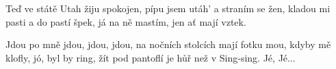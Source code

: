 \beginverse{}
Teď ve státě Utah žiju spokojen,
pípu jsem utáh' a straním se žen,
\lrep{} kladou mi pasti a do pastí špek,
já na ně mastím, jen ať mají vztek. \rrep{}
\endverse{}

\beginchorus{}
Jdou po mně jdou, jdou, jdou,
na nočních stolcích mají fotku mou,
kdyby mě klofly, jó, byl by ring,
žít pod pantoflí je hůř než v Sing-sing. Jé, Jé... 
\endchorus{}

\endsong{}
